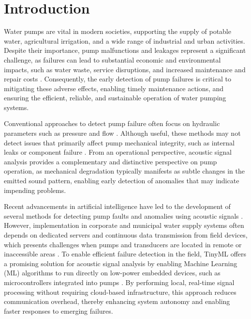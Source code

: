 \section{Introduction}

Water pumps are vital in modern societies, supporting the supply of potable water, agricultural irrigation, and a wide range of industrial and urban activities. Despite their importance, pump malfunctions and leakages represent a significant challenge, as failures can lead to substantial economic and environmental impacts, such as water waste, service disruptions, and increased maintenance and repair costs \cite{che2021water, moleda2020predictive, jakobsen2023detecting}. Consequently, the early detection of pump failures is critical to mitigating these adverse effects, enabling timely maintenance actions, and ensuring the efficient, reliable, and sustainable operation of water pumping systems.

Conventional approaches to detect pump failure often focus on hydraulic parameters such as pressure and flow \cite{buffa2021advanced,jiang2020novel}. Although useful, these methods may not detect issues that primarily affect pump mechanical integrity, such as internal leaks or component failure \cite{barrientos2023water}. From an operational perspective, acoustic signal analysis provides a complementary and distinctive perspective on pump operation, as mechanical degradation typically manifests as subtle changes in the emitted sound pattern, enabling early detection of anomalies that may indicate impending problems.

Recent advancements in artificial intelligence have led to the development of several methods for detecting pump faults and anomalies using acoustic signals \cite{sun2023pump,pu2023research}. However, implementation in corporate and municipal water supply systems often depends on dedicated servers and continuous data transmission from field devices, which presents challenges when pumps and transducers are located in remote or inaccessible areas \cite{olsson2021urban}. To enable efficient failure detection in the field, TinyML offers a promising solution for acoustic signal analysis by enabling Machine Learning (ML) algorithms to run directly on low-power embedded devices, such as microcontrollers integrated into pumps \cite{abadade2023comprehensive}. By performing local, real-time signal processing without requiring cloud-based infrastructure, this approach reduces communication overhead, thereby enhancing system autonomy and enabling faster responses to emerging failures.

